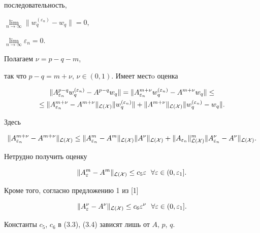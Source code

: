 последовательность, 


$\lim\limits_{n\to\infty}\|w^{(\varepsilon_n)}_q-w_q\|=0$, 


$\lim\limits_{n\to\infty}\varepsilon_n=0$.


Полагаем $\nu=p-q-m$,


так что $p-q=m+\nu$, $\nu\in(0,1)$. Имеет местo оценка


\begin{multline}


\|A^{p-q}_{\varepsilon_n}w^{(\varepsilon_n)}_q-A^{p-q}


w_q\|=\|A^{m+\nu}_{\varepsilon_n}w^{(\varepsilon_n)}_q-


A^{m+\nu}w_q\|\le \\


%


\le \|A^{m+\nu}_{\varepsilon_n}-A^{m+\nu}\|_\CL


\|w^{(\varepsilon_n)}_q\|+\|A^{m+\nu}\|_\CL


\|w^{(\varepsilon_n)}_q-w_q\|.


\end{multline}


Здесь


\begin{equation}


\|A^{m+\nu}_{\varepsilon_n}-A^{m+\nu}\|_\CL\le


\|A^m_{\varepsilon_n}-A^m\|_\CL\|A^\nu\|_\CL+


\|A_{\varepsilon_n}\|^m_\CL\|A^\nu_{\varepsilon_n}-A^\nu\|_\CL.


\end{equation}


Нетрудно получить оценку


\begin{equation}


\|A^m_\varepsilon-A^m\|_\CL\le c_5\varepsilon


\ \ \forall\varepsilon\in(0,\varepsilon_1].


\end{equation}


Кроме того, согласно предложению 1 из [1]


\begin{equation}


\|A^\nu_\varepsilon-A^\nu\|_\CL\le c_6 \varepsilon^\nu


\ \ \forall \varepsilon\in(0,\varepsilon_1].\end{equation}


Константы $c_5$, $c_6$ в (3.3), (3.4) зависят лишь от $A$, $p$, $q$.


